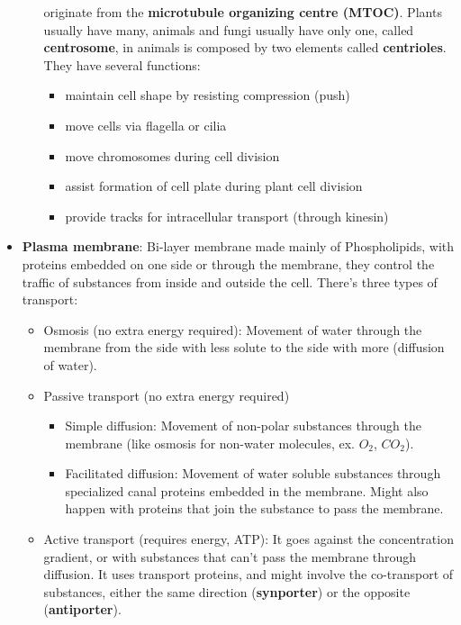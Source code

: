 \documentclass[a4paper,landscape,10pt]{cheatsheet}
\begin{document}
\begin{itemize}
\begin{itemize}
                        originate from the \textbf{microtubule organizing centre (MTOC)}. Plants usually have many, animals and
                        fungi usually have only one, called \textbf{centrosome}, in animals is composed by two elements called
                        \textbf{centrioles}. They have several functions:
                        \begin{itemize}
                              \item maintain cell shape by resisting compression (push)
                              \item move cells via flagella or cilia
                              \item move chromosomes during cell division
                              \item assist formation of cell plate during plant cell division
                              \item provide tracks for intracellular transport (through kinesin)
                        \end{itemize}
            \end{itemize}
      \item \textbf{Plasma membrane}: Bi-layer membrane made mainly of Phospholipids, with proteins embedded on one side or
            through the membrane, they control the traffic of substances from inside and outside the cell. There's three
            types of transport:
            \begin{itemize}
                  \item Osmosis (no extra energy required): Movement of water through the membrane from the side with less
                        solute to the side with more (diffusion of water).
                  \item Passive transport (no extra energy required)
                        \begin{itemize}
                              \item Simple diffusion: Movement of non-polar substances through the membrane (like osmosis for
                                    non-water molecules, ex. $O_2$, $CO_2$).
                              \item Facilitated diffusion: Movement of water soluble substances through specialized canal proteins
                                    embedded in the membrane. Might also happen with proteins that join the substance to pass the
                                    membrane.
                        \end{itemize}
                  \item Active transport (requires energy, ATP): It goes against the concentration gradient, or with substances
                        that can't pass the membrane through diffusion. It uses transport proteins, and might involve the
                        co-transport of substances, either the same direction (\textbf{synporter}) or the opposite
                        (\textbf{antiporter}).

            \end{itemize}
\end{itemize}
\end{document}
